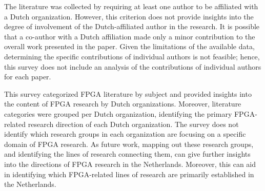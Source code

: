 

The literature was collected by requiring at least one author to be affiliated with a Dutch organization. However, this criterion does not provide insights into the degree of involvement of the Dutch-affiliated author in the research. It is possible that a co-author with a Dutch affiliation made only a minor contribution to the overall work presented in the paper. Given the limitations of the available data, determining the specific contributions of individual authors is not feasible; hence, this survey does not include an analysis of the contributions of individual authors for each paper.

This survey categorized FPGA literature by subject and provided insights into the content of FPGA research by Dutch organizations. Moreover, literature categories were grouped per Dutch organization, identifying the primary FPGA-related research direction of each Dutch organization. The survey does not identify which research groups in each organization are focusing on a specific domain of FPGA research. As future work, mapping out these research groups, and identifying the lines of research connecting them, can give further insights into the directions of FPGA research in the Netherlands. Moreover, this can aid in identifying which FPGA-related lines of research are primarily established in the Netherlands.